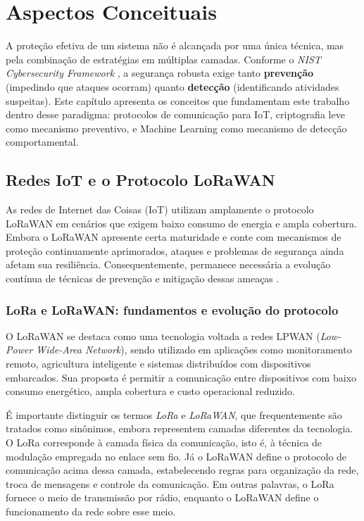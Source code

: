 \chapter{Aspectos Conceituais} \label{cap:conceitos}


A proteção efetiva de um sistema não é alcançada por uma única técnica, 
mas pela combinação de estratégias em múltiplas camadas. Conforme o 
\textit{NIST Cybersecurity Framework} \cite{nist_csf_2024}, a segurança 
robusta exige tanto \textbf{prevenção} (impedindo que ataques ocorram) 
quanto \textbf{detecção} (identificando atividades suspeitas). Este 
capítulo apresenta os conceitos que fundamentam este trabalho dentro 
desse paradigma: protocolos de comunicação para IoT, criptografia leve 
como mecanismo preventivo, e Machine Learning como mecanismo de detecção 
comportamental.


\section{Redes IoT e o Protocolo LoRaWAN}

As redes de Internet das Coisas (IoT) utilizam amplamente o protocolo LoRaWAN em cenários que exigem baixo consumo de energia e ampla cobertura. Embora o LoRaWAN apresente certa maturidade e conte com mecanismos de proteção continuamente aprimorados, ataques e problemas de segurança ainda afetam sua resiliência. Consequentemente, permanece necessária a evolução contínua de técnicas de prevenção e mitigação dessas ameaças \cite{hessel2023lorawan}.


\subsection{LoRa e LoRaWAN: fundamentos e evolução do protocolo}

O LoRaWAN se destaca como uma tecnologia voltada a redes LPWAN (\textit{Low-Power Wide-Area Network}), sendo utilizado em aplicações como monitoramento remoto, agricultura inteligente e sistemas distribuídos com dispositivos embarcados. Sua proposta é permitir a comunicação entre dispositivos com baixo consumo energético, ampla cobertura e custo operacional reduzido.

É importante distinguir os termos \textit{LoRa} e \textit{LoRaWAN}, que frequentemente são tratados como sinônimos, embora representem camadas diferentes da tecnologia. O LoRa corresponde à camada física da comunicação, isto é, à técnica de modulação empregada no enlace sem fio. Já o LoRaWAN define o protocolo de comunicação acima dessa camada, estabelecendo regras para organização da rede, troca de mensagens e controle da comunicação. Em outras palavras, o LoRa fornece o meio de transmissão por rádio, enquanto o LoRaWAN define o funcionamento da rede sobre esse meio.

